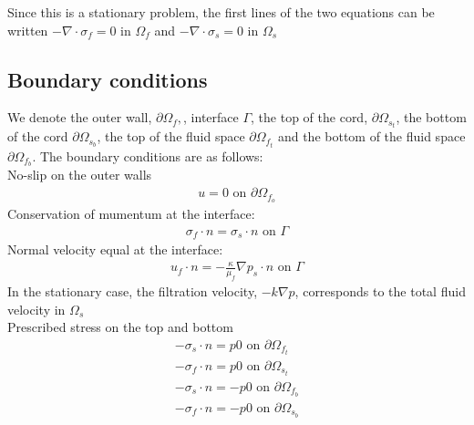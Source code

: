 Since this is a stationary problem, the first lines of the two equations can be written $-\nabla \cdot \sigma_f = 0$ in $\Omega_f$ and $-\nabla \cdot \sigma_s = 0$ in $\Omega_s$ 




\subsection{Boundary conditions}
We denote the outer wall, $\partial \Omega_f,$, interface $\Gamma$, the top of the cord, $\partial \Omega_{s_t}$, the bottom of the cord $\partial \Omega_{s_b}$, the top of the fluid space $\partial \Omega_{f_t}$ and the bottom of the fluid space $\partial \Omega_{f_b}$. The boundary conditions are as follows: \\
No-slip on the outer walls
\begin{align} u = 0 \text{ on } \partial \Omega_{f_o} \end{align}
Conservation of mumentum at the interface:
\begin{align} \sigma_f \cdot n = \sigma_s \cdot n \text{ on } \Gamma \end{align}
Normal velocity equal at the interface:
\begin{align} u_f \cdot n = - \frac{\kappa}{\mu_f} \nabla p_s \cdot n  \text{ on } \Gamma \end{align}
In the stationary case, the filtration velocity, $-k\nabla p $, corresponds to the total fluid velocity in $\Omega_s$ \\
Prescribed stress on the top and bottom
\begin{align} -\sigma_s \cdot n = p0 \text{ on } \partial \Omega_{f_t} \nonumber \\
			  -\sigma_f \cdot n = p0 \text{ on } \partial \Omega_{s_t} \\
			  -\sigma_s \cdot n = -p0 \text{ on } \partial \Omega_{f_b} \nonumber \\
			  -\sigma_f \cdot n = -p0 \text{ on } \partial \Omega_{s_b} \nonumber
\end{align}



